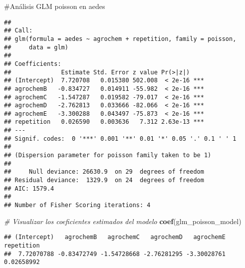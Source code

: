 \documentclass[
]{article}
\newenvironment{Shaded}{\begin{snugshade}}{\end{snugshade}}
\newcommand{\AttributeTok}[1]{\textcolor[rgb]{0.13,0.29,0.53}{#1}}
\newcommand{\CommentTok}[1]{\textcolor[rgb]{0.56,0.35,0.01}{\textit{#1}}}
\newcommand{\FunctionTok}[1]{\textcolor[rgb]{0.13,0.29,0.53}{\textbf{#1}}}
\newcommand{\NormalTok}[1]{#1}
\newcommand{\OtherTok}[1]{\textcolor[rgb]{0.56,0.35,0.01}{#1}}
\newcommand{\SpecialCharTok}[1]{\textcolor[rgb]{0.81,0.36,0.00}{\textbf{#1}}}
\newcommand{\StringTok}[1]{\textcolor[rgb]{0.31,0.60,0.02}{#1}}
\begin{document}
\#Análisis GLM poisson en aedes

\begin{Shaded}
\end{Shaded}

\begin{verbatim}
## 
## Call:
## glm(formula = aedes ~ agrochem + repetition, family = poisson, 
##     data = glm)
## 
## Coefficients:
##              Estimate Std. Error z value Pr(>|z|)    
## (Intercept)  7.720708   0.015380 502.008  < 2e-16 ***
## agrochemB   -0.834727   0.014911 -55.982  < 2e-16 ***
## agrochemC   -1.547287   0.019582 -79.017  < 2e-16 ***
## agrochemD   -2.762813   0.033666 -82.066  < 2e-16 ***
## agrochemE   -3.300288   0.043497 -75.873  < 2e-16 ***
## repetition   0.026590   0.003636   7.312 2.63e-13 ***
## ---
## Signif. codes:  0 '***' 0.001 '**' 0.01 '*' 0.05 '.' 0.1 ' ' 1
## 
## (Dispersion parameter for poisson family taken to be 1)
## 
##     Null deviance: 26630.9  on 29  degrees of freedom
## Residual deviance:  1329.9  on 24  degrees of freedom
## AIC: 1579.4
## 
## Number of Fisher Scoring iterations: 4
\end{verbatim}

\begin{Shaded}
\begin{Highlighting}[]
\CommentTok{\# Visualizar los coeficientes estimados del modelo}
\FunctionTok{coef}\NormalTok{(glm\_poisson\_model)}
\end{Highlighting}
\end{Shaded}

\begin{verbatim}
## (Intercept)   agrochemB   agrochemC   agrochemD   agrochemE  repetition 
##  7.72070788 -0.83472749 -1.54728668 -2.76281295 -3.30028761  0.02658992
\end{verbatim}
\end{document}
